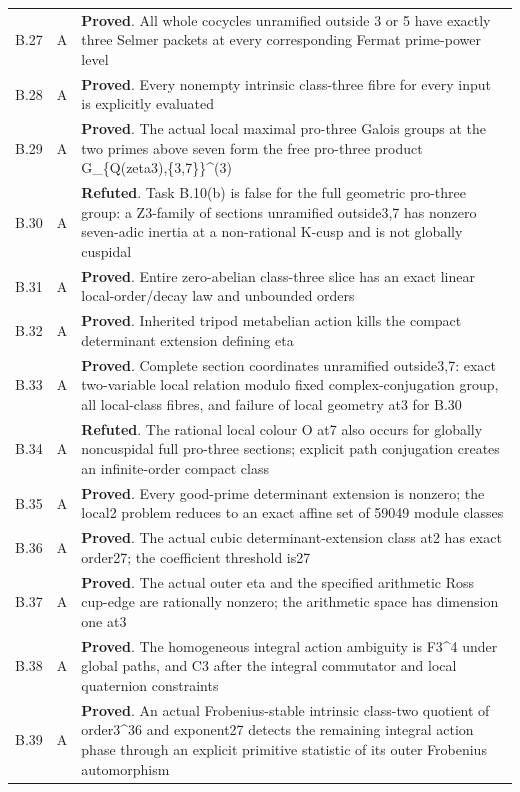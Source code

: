 \begin{longtable}{@{}p{}p{}p{}@{}}
B.27 & A & \textbf{Proved}. All whole cocycles unramified outside 3 or 5 have exactly three Selmer packets at every corresponding Fermat prime-power level \\
B.28 & A & \textbf{Proved}. Every nonempty intrinsic class-three fibre for every input is explicitly evaluated \\
B.29 & A & \textbf{Proved}. The actual local maximal pro-three Galois groups at the two primes above seven form the free pro-three product G\_\{Q(zeta3),\{3,7\}\}\textasciicircum{}(3) \\
B.30 & A & \textbf{Refuted}. Task B.10(b) is false for the full geometric pro-three group: a Z3-family of sections unramified outside3,7 has nonzero seven-adic inertia at a non-rational K-cusp and is not globally cuspidal \\
B.31 & A & \textbf{Proved}. Entire zero-abelian class-three slice has an exact linear local-order/decay law and unbounded orders \\
B.32 & A & \textbf{Proved}. Inherited tripod metabelian action kills the compact determinant extension defining eta \\
B.33 & A & \textbf{Proved}. Complete section coordinates unramified outside3,7: exact two-variable local relation modulo fixed complex-conjugation group, all local-class fibres, and failure of local geometry at3 for B.30 \\
B.34 & A & \textbf{Refuted}. The rational local colour O at7 also occurs for globally noncuspidal full pro-three sections; explicit path conjugation creates an infinite-order compact class \\
B.35 & A & \textbf{Proved}. Every good-prime determinant extension is nonzero; the local2 problem reduces to an exact affine set of 59049 module classes \\
B.36 & A & \textbf{Proved}. The actual cubic determinant-extension class at2 has exact order27; the coefficient threshold is27 \\
B.37 & A & \textbf{Proved}. The actual outer eta and the specified arithmetic Ross cup-edge are rationally nonzero; the arithmetic space has dimension one at3 \\
B.38 & A & \textbf{Proved}. The homogeneous integral action ambiguity is F3\textasciicircum{}4 under global paths, and C3 after the integral commutator and local quaternion constraints \\
B.39 & A & \textbf{Proved}. An actual Frobenius-stable intrinsic class-two quotient of order3\textasciicircum{}36 and exponent27 detects the remaining integral action phase through an explicit primitive statistic of its outer Frobenius automorphism \\

\end{longtable}
